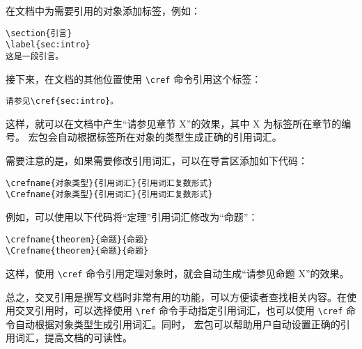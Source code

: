 在文档中为需要引用的对象添加标签，例如：

\begin{Verbatim}
\section{引言}
\label{sec:intro}
这是一段引言。
\end{Verbatim}

接下来，在文档的其他位置使用 \verb|\cref| 命令引用这个标签：
\begin{Verbatim}
请参见\cref{sec:intro}。
\end{Verbatim}
这样，就可以在文档中产生“请参见章节 X”的效果，其中 X 为标签所在章节的编号。 宏包会自动根据标签所在对象的类型生成正确的引用词汇。

需要注意的是，如果需要修改引用词汇，可以在导言区添加如下代码：

\begin{Verbatim}
\crefname{对象类型}{引用词汇}{引用词汇复数形式}
\Crefname{对象类型}{引用词汇}{引用词汇复数形式}
\end{Verbatim}

例如，可以使用以下代码将“定理”引用词汇修改为“命题”：
\begin{Verbatim}
\crefname{theorem}{命题}{命题}
\Crefname{theorem}{命题}{命题}
\end{Verbatim}
这样，使用 \verb|\cref| 命令引用定理对象时，就会自动生成“请参见命题 X”的效果。

总之，交叉引用是撰写文档时非常有用的功能，可以方便读者查找相关内容。在使用交叉引用时，可以选择使用 \verb|\ref| 命令手动指定引用词汇，也可以使用 \verb|\cref| 命令自动根据对象类型生成引用词汇。同时， 宏包可以帮助用户自动设置正确的引用词汇，提高文档的可读性。